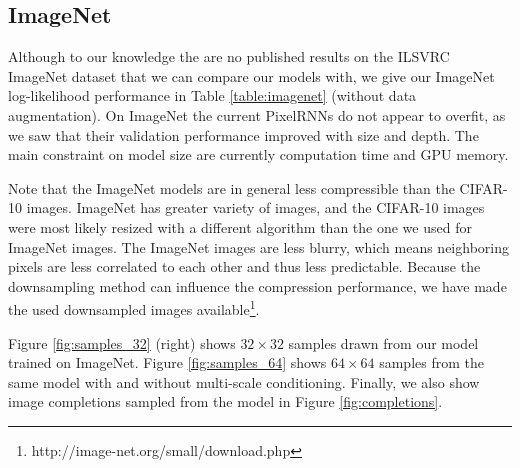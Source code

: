 

\vspace{0.4cm}
\subsection{ImageNet}

Although to our knowledge the are no published results on the ILSVRC ImageNet dataset \cite{ILSVRC15} that we can compare our models with, we give our ImageNet log-likelihood performance in Table \ref{table:imagenet} (without data augmentation). On ImageNet the current PixelRNNs do not appear to overfit, as we saw that their validation performance improved with size and depth. The main constraint on model size are currently computation time and GPU memory.

Note that the ImageNet models are in general less compressible than the CIFAR-10 images. ImageNet has greater variety of images, and the CIFAR-10 images were most likely resized with a different algorithm than the one we used for ImageNet images. The ImageNet images are less blurry, which means neighboring pixels are less correlated to each other and thus less predictable. Because the downsampling method can influence the compression performance, we have made the used downsampled images available\footnote{http://image-net.org/small/download.php}.

Figure \ref{fig:samples_32} (right) shows $32\times32$ samples drawn from our model trained on ImageNet. Figure \ref{fig:samples_64} shows $64\times64$ samples from the same model with and without multi-scale conditioning. Finally, we also show image completions sampled from the model in Figure \ref{fig:completions}.






